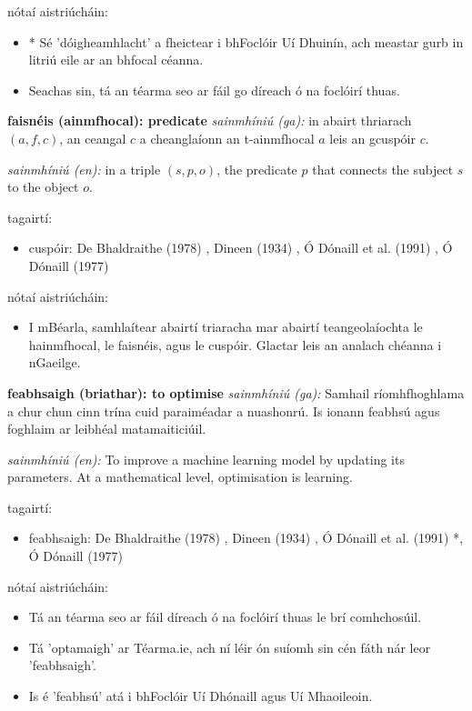 \documentclass{article}
\begin{document}
nótaí aistriúcháin:
\begin{itemize}
	\item * Sé 'dóigheamhlacht' a fheictear i bhFoclóir Uí Dhuinín, ach meastar gurb in litriú eile ar an bhfocal céanna.
	\item Seachas sin, tá an téarma seo ar fáil go díreach ó na foclóirí thuas.
\end{itemize}


\textbf{faisnéis (ainmfhocal): predicate}
\textit{sainmhíniú (ga):} in abairt thriarach $(a,f,c)$, an ceangal $c$ a cheanglaíonn an t-ainmfhocal $a$ leis an gcuspóir $c$.

\textit{sainmhíniú (en):} in a triple $(s,p,o)$, the predicate $p$ that connects the subject $s$ to the object $o$.

tagairtí:
\begin{itemize}
	\item cuspóir: De Bhaldraithe (1978) \cite{de-bhaldraithe}, Dineen (1934) \cite{dineen}, Ó Dónaill et al. (1991) \cite{focloir-beag}, Ó Dónaill (1977) \cite{odonaill}
\end{itemize}

nótaí aistriúcháin:
\begin{itemize}
	\item I mBéarla, samhlaítear abairtí triaracha mar abairtí teangeolaíochta le hainmfhocal, le faisnéis, agus le cuspóir. Glactar leis an analach chéanna i nGaeilge.
\end{itemize}


\textbf{feabhsaigh (briathar): to optimise}
\textit{sainmhíniú (ga):} Samhail ríomhfhoghlama a chur chun cinn trína cuid paraiméadar a nuashonrú. Is ionann feabhsú agus foghlaim ar leibhéal matamaiticiúil.

\textit{sainmhíniú (en):} To improve a machine learning model by updating its parameters. At a mathematical level, optimisation is learning.

tagairtí:
\begin{itemize}
	\item feabhsaigh: De Bhaldraithe (1978) \cite{de-bhaldraithe}, Dineen (1934) \cite{dineen}, Ó Dónaill et al. (1991) \cite{focloir-beag}*, Ó Dónaill (1977) \cite{odonaill}
\end{itemize}

nótaí aistriúcháin:
\begin{itemize}
	\item Tá an téarma seo ar fáil díreach ó na foclóirí thuas le brí comhchosúil.
	\item Tá 'optamaigh' ar Téarma.ie, ach ní léir ón suíomh sin cén fáth nár leor 'feabhsaigh'.
	\item Is é 'feabhsú' atá i bhFoclóir Uí Dhónaill agus Uí Mhaoileoin.
\end{itemize}
\end{document}

